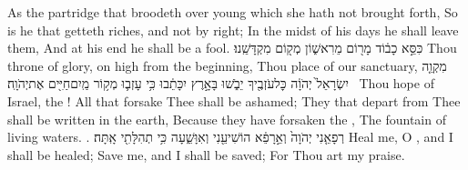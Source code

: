 {As the partridge that broodeth over young which she hath not brought forth, So is he that getteth riches, and not by right; In the midst of his days he shall leave them, And at his end he shall be a fool.}
{כִּסֵּ֣א כָב֔וֹד מָר֖וֹם מֵרִאשׁ֑וֹן מְק֖וֹם מִקְדָּשֵֽׁנוּ׃}
{Thou throne of glory, on high from the beginning, Thou place of our sanctuary,}
{מִקְוֵ֤ה יִשְׂרָאֵל֙ יְהֹוָ֔ה כׇּל\maqqaf עֹזְבֶ֖יךָ יֵבֹ֑שׁוּ  בָּאָ֣רֶץ יִכָּתֵ֔בוּ כִּ֥י עָזְב֛וּ מְק֥וֹר מַֽיִם\maqqaf חַיִּ֖ים אֶת\maqqaf יְהֹוָֽה׃ \petucha }
{Thou hope of Israel, the \lord! All that forsake Thee shall be ashamed; They that depart from Thee shall be written in the earth, Because they have forsaken the \lord, The fountain of living waters. .}
{רְפָאֵ֤נִי יְהֹוָה֙ וְאֵ֣רָפֵ֔א הוֹשִׁיעֵ֖נִי וְאִוָּשֵׁ֑עָה כִּ֥י תְהִלָּתִ֖י אָֽתָּה׃}
{Heal me, O \lord, and I shall be healed; Save me, and I shall be saved; For Thou art my praise.}
\newperek
